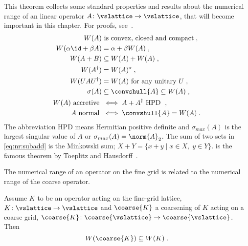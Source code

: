 \begin{theorem} \label{thm:nr:properties}
This theorem collects some standard properties and results about the numerical range of an linear operator $A \colon \vslattice \rightarrow \vslattice$, that will become important in this chapter.
For proofs, see~\cite{gustafson1997numerical}.
\begin{align}
    W(A) &\text{ is convex, closed and compact} \;,                     \label{eq:nr:convex}    \\
    W(\alpha \id + \beta A) &= \alpha + \beta W(A) \;,                  \label{eq:nr:linear}    \\
    W(A + B) &\subseteq W(A) + W(A) \;,                                 \label{eq:nr:subadd}    \\
    W(A^{\dagger}) &= W(A)^{\star} \;,                                  \label{eq:nr:dagger}    \\
    W(U A U^{\dagger}) &= W(A) \text{ for any unitary $U$} \;,          \label{eq:nr:unitary}   \\
    \sigma(A) &\subseteq \convshull{A} \subseteq W(A) \;,               \label{eq:nr:convhull}  \\
    W(A) \text{ accretive } &\iff A+A^{\dagger} \text{ HPD } \;,        \label{eq:nr:accretive} \\
    A \text{ normal } &\iff \convshull{A} = W(A) \;.                    \label{eq:nr:normal}    %
\end{align}
The abbreviation HPD means Hermitian positive definite and $\sigma_{max}(A)$ is the largest singular value of $A$ or $\sigma_{max}(A) = \norm{A}_2$.
The sum of two sets in \cref{eq:nr:subadd} is the Minkowski sum; $X+Y = \{x+y \mid x \in X, \; y \in Y\}$.
 is the famous theorem by Toeplitz and Hausdorff~\cite{toeplitz1918algebraische,hausdorff1919wertvorrat}.
\end{theorem}

The numerical range of an operator on the fine grid is related to the numerical range of the coarse operator.

\begin{theorem} \label{thm:numerical:range}
Assume $K$ to be an operator acting on the fine-grid lattice, $K \colon \vslattice \rightarrow \vslattice$ and $\coarse{K}$ a coarsening of $K$ acting on a coarse grid, $\coarse{K} \colon \coarse{\vslattice} \rightarrow \coarse{\vslattice}$.
Then
\begin{equation}
W(\coarse{K}) \subseteq W(K) \;.
\end{equation}
\end{theorem}

